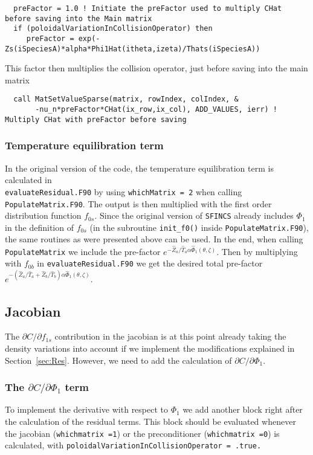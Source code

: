 \documentclass[12pt]{article}
\begin{document}
\begin{lstlisting}
  preFactor = 1.0 ! Initiate the preFactor used to multiply CHat before saving into the Main matrix
  if (poloidalVariationInCollisionOperator) then 
     preFactor = exp(-Zs(iSpeciesA)*alpha*Phi1Hat(itheta,izeta)/Thats(iSpeciesA)) 
\end{lstlisting}
This factor then multiplies the collision operator, just before saving into the main matrix
\begin{lstlisting}
  call MatSetValueSparse(matrix, rowIndex, colIndex, &
       -nu_n*preFactor*CHat(ix_row,ix_col), ADD_VALUES, ierr) ! Multiply CHat with preFactor before saving
\end{lstlisting}
\subsubsection*{Temperature equilibration term}
In the original version of the code, the temperature equilibration term is calculated in \\ \texttt{evaluateResidual.F90} by using \texttt{whichMatrix = 2} when calling \texttt{PopulateMatrix.F90}. The output is then multiplied with the first order distribution function $f_{0s}$. Since the original version of \texttt{SFINCS} already includes $\Phi_1$ in the definition of $f_{0s}$ (in the subroutine \texttt{init\_f0()} inside \texttt{PopulateMatrix.F90}), the same routines as were presented above can be used. In the end, when calling \texttt{PopulateMatrix} we include the pre-factor $e^{-\hat Z_a/\hat T_a \alpha\hat\Phi_1(\theta,\zeta)}$. Then by multiplying with $f_{0b}$ in \texttt{evaluateResidual.F90} we get the desired total pre-factor $e^{-\left(\hat Z_a/\hat T_a + \hat Z_b/\hat T_b\right) \alpha\hat\Phi_1(\theta,\zeta)}$.

\subsection*{Jacobian}
The $\partial C/\partial f_{1s}$ contribution in the jacobian is at this point already taking the density variations into account if we implement the modifications explained in Section~\ref{sec:Res}. However, we need to add the calculation of $\partial C/\partial \Phi_1$.

\subsubsection*{The $\partial C/\partial \Phi_1$ term}
\label{sec:Jac1}
To implement the derivative with respect to $\Phi_1$ we add another block right after the calculation of the residual terms. This block should be evaluated whenever the jacobian (\texttt{whichmatrix =1}) or the preconditioner (\texttt{whichmatrix =0}) is calculated, with \texttt{poloidalVariationInCollisionOperator = .true.}
\end{document}
